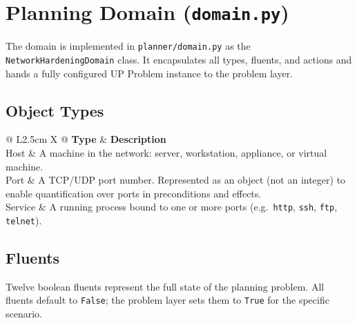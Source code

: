 \documentclass[12pt,a4paper]{article}
\newcommand{\hrow}{\rowcolor{rowgray}}
\begin{document}
	\section{Planning Domain (\texttt{domain.py})}
	
	The domain is implemented in \texttt{planner/domain.py} as the \texttt{NetworkHardeningDomain}
	class. It encapsulates all types, fluents, and actions and hands a fully configured UP Problem
	instance to the problem layer.
	
	\subsection{Object Types}
	
	\begin{table}[h!]
		\centering
		\caption{Object types used in the planning domain}
		\renewcommand{\arraystretch}{1.3}
		\begin{tabularx}{\linewidth}{@{} L{2.5cm} X @{}}
			\toprule
			\textbf{Type} & \textbf{Description} \\
			\midrule
			\hrow Host    & A machine in the network: server, workstation, appliance, or virtual machine. \\
			Port    & A TCP/UDP port number. Represented as an object (not an integer) to enable quantification over ports in preconditions and effects. \\
			\hrow Service & A running process bound to one or more ports (e.g.\ \texttt{http}, \texttt{ssh}, \texttt{ftp}, \texttt{telnet}). \\
			\bottomrule
		\end{tabularx}
	\end{table}
	
	\subsection{Fluents}
	
	Twelve boolean fluents represent the full state of the planning problem. All fluents default to
	\texttt{False}; the problem layer sets them to \texttt{True} for the specific scenario.
	
\end{document}
